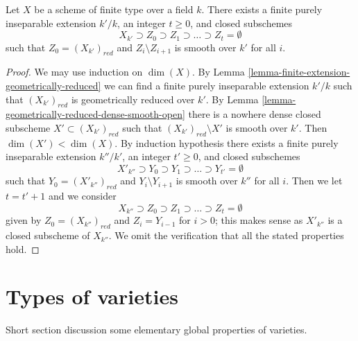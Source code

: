 \begin{lemma}
\label{lemma-smooth-stratification}
Let $X$ be a scheme of finite type over a field $k$.
There exists a finite purely inseparable extension $k'/k$,
an integer $t \geq 0$, and closed subschemes
$$
X_{k'} \supset Z_0 \supset Z_1 \supset \ldots \supset Z_t = \emptyset
$$
such that $Z_0 = (X_{k'})_{red}$ and $Z_i \setminus Z_{i + 1}$
is smooth over $k'$ for all $i$.
\end{lemma}

\begin{proof}
We may use induction on $\dim(X)$. By
Lemma \ref{lemma-finite-extension-geometrically-reduced}
we can find a finite purely inseparable extension $k'/k$
such that $(X_{k'})_{red}$ is geometrically reduced over $k'$.
By Lemma \ref{lemma-geometrically-reduced-dense-smooth-open}
there is a nowhere dense closed subscheme $X' \subset (X_{k'})_{red}$
such that $(X_{k'})_{red} \setminus X'$ is smooth over $k'$.
Then $\dim(X') < \dim(X)$. By induction hypothesis there exists
a finite purely inseparable extension $k''/k'$,
an integer $t' \geq 0$, and closed subschemes
$$
X'_{k''} \supset Y_0 \supset Y_1 \supset \ldots \supset Y_{t'} = \emptyset
$$
such that $Y_0 = (X'_{k''})_{red}$ and $Y_i \setminus Y_{i + 1}$
is smooth over $k''$ for all $i$. Then we let $t = t' + 1$
and we consider
$$
X_{k''} \supset Z_0 \supset Z_1 \supset \ldots \supset Z_t = \emptyset
$$
given by $Z_0 = (X_{k''})_{red}$ and $Z_i = Y_{i - 1}$ for $i > 0$;
this makes sense as $X'_{k''}$ is a closed subscheme of $X_{k''}$.
We omit the verification that all the stated properties hold.
\end{proof}




\section{Types of varieties}
\label{section-types}

\noindent
Short section discussion some elementary global properties of varieties.

